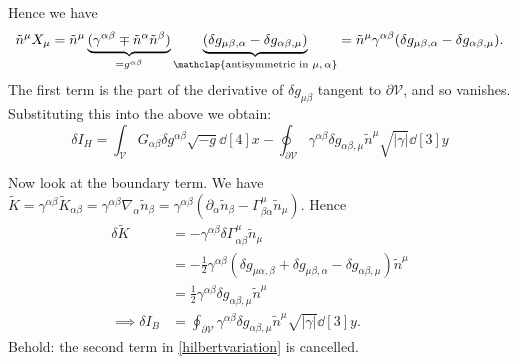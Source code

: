 \documentclass{jknotes}
\begin{document}
Hence we have
\begin{equation}
    \tilde{n}^\mu X_\mu = \tilde{n}^\mu\underbrace{(\gamma^{\alpha\beta} \mp \tilde{n}^\alpha\tilde{n}^\beta)}_{=g^{\alpha\beta}}\underbrace{(\delta g_{\mu\beta,\alpha}-\delta g_{\alpha\beta,\mu})}_{\mathclap{\text{antisymmetric in \(\mu,\alpha\)}}} = \tilde{n}^\mu\gamma^{\alpha\beta}(\delta g_{\mu\beta,\alpha} - \delta g_{\alpha\beta,\mu}).
\end{equation}
The first term is the part of the derivative of \(\delta g_{\mu\beta}\) tangent to \(\partial\mathcal{V}\), and so vanishes. Substituting this into the above we obtain:
\begin{equation}
    \delta I_H = \int_{\mathcal{V}} G_{\alpha\beta}\delta g^{\alpha\beta}\sqrt{-g}\dd[4]{x} - \oint_{\partial\mathcal{V}}\gamma^{\alpha\beta}\delta g_{\alpha\beta,\mu}\tilde{n}^\mu\sqrt{|\gamma|}\dd[3]{y}
    \label{hilbertvariation}
    \tag{\(*\)}
\end{equation}

Now look at the boundary term. We have \(\tilde{K} = \gamma^{\alpha\beta}\tilde{K}_{\alpha\beta} = \gamma^{\alpha\beta}\nabla_\alpha \tilde{n}_\beta = \gamma^{\alpha\beta}(\partial_\alpha\tilde{n}_\beta - \Gamma^\mu_{\beta\alpha}\tilde{n}_\mu)\). Hence
\begin{align}
    \delta\tilde{K} &= -\gamma^{\alpha\beta}\delta\Gamma^\mu_{\alpha\beta}\tilde{n}_\mu \\
                    &= -\frac12\gamma^{\alpha\beta}(\delta g_{\mu\alpha,\beta} + \delta g_{\mu\beta,\alpha} - \delta g_{\alpha\beta,\mu}) \tilde{n}^\mu \\
                    &= \frac12\gamma^{\alpha\beta}\delta g_{\alpha\beta,\mu} \tilde{n}^\mu \\
    \implies \delta I_B &= \oint_{\partial\mathcal{V}} \gamma^{\alpha\beta} \delta g_{\alpha\beta,\mu}\tilde{n}^\mu\sqrt{|\gamma|}\dd[3]{y}.
\end{align}
Behold: the second term in \eqref{hilbertvariation} is cancelled.
\end{document}
